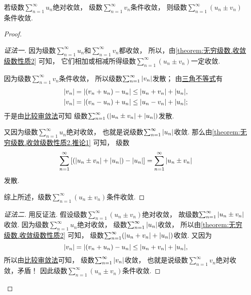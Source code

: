 \begin{proposition}\label{theorem:绝对收敛.命题1}
若级数\(\sum_{n=1}^\infty u_n\)绝对收敛，
级数\(\sum_{n=1}^\infty v_n\)条件收敛，
则级数\(\sum_{n=1}^\infty (u_n \pm v_n)\)条件收敛.
\begin{proof}
\begin{proof}[证法一]
因为级数\(\sum_{n=1}^\infty u_n\)和\(\sum_{n=1}^\infty v_n\)都收敛，
所以，由\cref{theorem:无穷级数.收敛级数性质2} 可知，
它们相加或相减所得级数\(\sum_{n=1}^\infty (u_n \pm v_n)\)一定收敛.

因为级数\(\sum_{n=1}^\infty v_n\)条件收敛，
所以级数\(\sum_{n=1}^\infty \abs{v_n}\)发散；
由\hyperref[theorem:不等式.三角不等式1]{三角不等式}有\begin{align*}
	\abs{v_n}
	= \abs{(v_n + u_n) - u_n}
	\leq \abs{u_n + v_n} + \abs{u_n}, \\
	\abs{v_n}
	= \abs{(v_n - u_n) + u_n}
	\leq \abs{u_n - v_n} + \abs{u_n};
\end{align*}
于是由\hyperref[theorem:无穷级数.正项级数的比较审敛法]{比较审敛法}可知
级数\(\sum_{n=1}^\infty \left( \abs{u_n \pm v_n} + \abs{u_n} \right)\)发散.

又因为级数\(\sum_{n=1}^\infty u_n\)绝对收敛，
也就是说级数\(\sum_{n=1}^\infty \abs{u_n}\)收敛.
那么由\cref{theorem:无穷级数.收敛级数性质2.推论1} 可知，
级数\begin{equation*}
	\sum_{n=1}^\infty \left[
		\left( \abs{u_n \pm v_n} + \abs{u_n} \right) - \abs{u_n}
	\right]
	= \sum_{n=1}^\infty \abs{u_n \pm v_n}
\end{equation*}发散.

综上所述，级数\(\sum_{n=1}^\infty (u_n \pm v_n)\)条件收敛.
\end{proof}
\begin{proof}[证法二]
用反证法.
假设级数\(\sum_{n=1}^\infty (u_n \pm v_n)\)绝对收敛，
故级数\(\sum_{n=1}^\infty \abs{u_n \pm v_n}\)收敛.
因为级数\(\sum_{n=1}^\infty u_n\)绝对收敛，
级数\(\sum_{n=1}^\infty \abs{u_n}\)收敛，
所以由\cref{theorem:无穷级数.收敛级数性质2} 可知，
级数\(\sum_{n=1}^\infty (\abs{u_n + v_n} + \abs{u_n})\)收敛.
又因为\begin{equation*}
	\abs{v_n}
	= \abs{(v_n + u_n) - u_n}
	\leq \abs{u_n + v_n} + \abs{u_n},
\end{equation*}
所以由\hyperref[theorem:无穷级数.正项级数的比较审敛法]{比较审敛法}可知，
级数\(\sum_{n=1}^\infty \abs{v_n}\)收敛，
也就是说级数\(\sum_{n=1}^\infty v_n\)绝对收敛，矛盾！
因此级数\(\sum_{n=1}^\infty (u_n \pm v_n)\)条件收敛.
\end{proof}\let\qed\relax
\end{proof}
\end{proposition}

